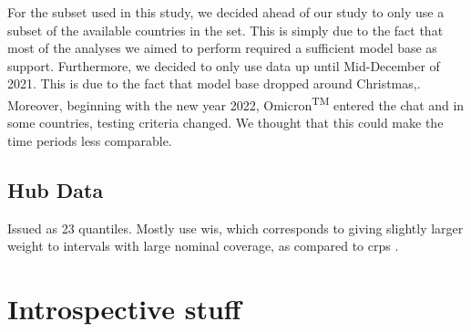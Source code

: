 For the subset used in this study, we decided ahead of our study to only use a subset of the available countries in the set. This is simply due to the fact that most of the analyses we aimed to perform required a sufficient model base as support. Furthermore, we decided to only use data up until Mid-December of 2021. This is due to the fact that model base dropped around Christmas,. Moreover, beginning with the new year 2022, Omicron\textsuperscript{TM} entered the chat and in some countries, testing criteria changed. We thought that this could make the time periods less comparable.\\
\subsection{Hub Data}
Issued as 23 quantiles. Mostly use \ac{wis}, which corresponds to giving slightly larger weight to intervals with large nominal coverage, as compared to \ac{crps} \citep{bracher_evaluating_2021}.
\section{Introspective stuff}
